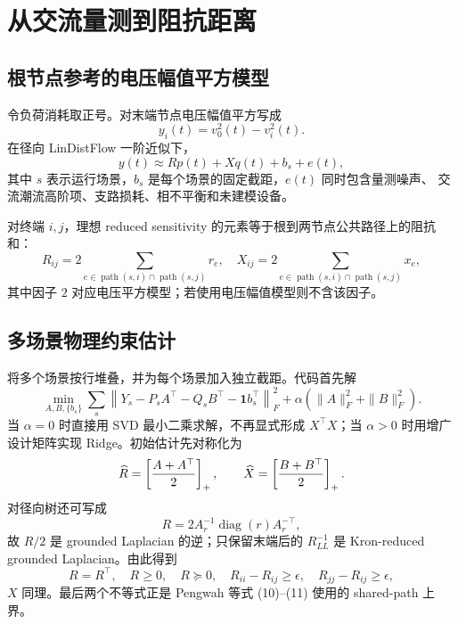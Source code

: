 \section{从交流量测到阻抗距离}

\subsection{根节点参考的电压幅值平方模型}

令负荷消耗取正号。对末端节点电压幅值平方写成
\begin{equation}
  y_i(t)=v_0^2(t)-v_i^2(t).
  \label{eq:drop-target}
\end{equation}
在径向 LinDistFlow 一阶近似下，
\begin{equation}
  y(t)\approx R p(t)+X q(t)+b_s+e(t),
  \label{eq:linear-drop}
\end{equation}
其中 $s$ 表示运行场景，$b_s$ 是每个场景的固定截距，$e(t)$ 同时包含量测噪声、
交流潮流高阶项、支路损耗、相不平衡和未建模设备。

对终端 $i,j$，理想 reduced sensitivity 的元素等于根到两节点公共路径上的阻抗和：
\begin{equation}
  R_{ij}=2\sum_{e\in \operatorname{path}(s,i)\cap
  \operatorname{path}(s,j)}r_e,
  \quad
  X_{ij}=2\sum_{e\in \operatorname{path}(s,i)\cap
  \operatorname{path}(s,j)}x_e,
\end{equation}
其中因子 $2$ 对应电压平方模型；若使用电压幅值模型则不含该因子。

\subsection{多场景物理约束估计}

将多个场景按行堆叠，并为每个场景加入独立截距。代码首先解
\begin{equation}
  \min_{A,B,\{b_s\}}
  \sum_s\left\|Y_s-P_sA^\top-Q_sB^\top
  -\boldsymbol{1}b_s^\top\right\|_F^2
  +\alpha(\|A\|_F^2+\|B\|_F^2).
  \label{eq:multiscenario-regression}
\end{equation}
当 $\alpha=0$ 时直接用 SVD 最小二乘求解，不再显式形成
$X^\top X$；当 $\alpha>0$ 时用增广设计矩阵实现 Ridge。初始估计先对称化为
\begin{equation}
  \widehat{R}=\left[\frac{A+A^\top}{2}\right]_+,
  \qquad
  \widehat{X}=\left[\frac{B+B^\top}{2}\right]_+.
  \label{eq:projected-rx}
\end{equation}
对径向树还可写成
\[
R=2A_r^{-1}\operatorname{diag}(r)A_r^{-\top},
\]
故 $R/2$ 是 grounded Laplacian 的逆；只保留末端后的 $R_{LL}^{-1}$
是 Kron-reduced grounded Laplacian。由此得到
\begin{equation}
R=R^\top,\quad R\ge0,\quad R\succeq0,\quad
R_{ii}-R_{ij}\ge\epsilon,\quad R_{jj}-R_{ij}\ge\epsilon,
\label{eq:matrix-constraints}
\end{equation}
$X$ 同理。最后两个不等式正是 Pengwah 等式 (10)--(11) 使用的
shared-path 上界\cite{pengwah2024}。

